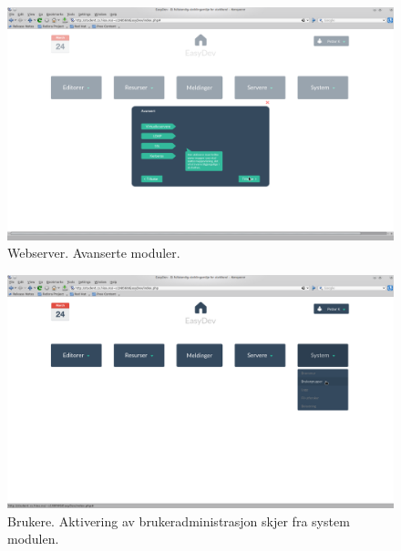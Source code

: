 \begin{figure}[ht]
\includegraphics[width=\textwidth,height=\textheight,keepaspectratio]{./img/prosessdokumentasjon/hifi/a5.png}
\caption[Hi-fi Webserver 5]{Webserver. Avanserte moduler.}
\label{fig:apachehi5}
\end{figure}

\begin{figure}[ht]
\includegraphics[width=\textwidth,height=\textheight,keepaspectratio]{./img/prosessdokumentasjon/hifi/b1.png}
\caption[Hi-fi Brukere 1]{Brukere. Aktivering av brukeradministrasjon skjer fra system modulen.}
\label{fig:brukerehi1}
\end{figure}

